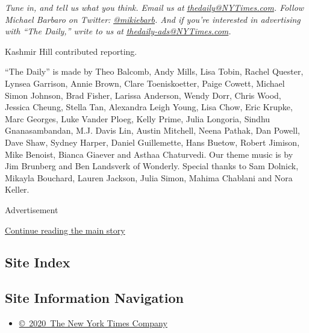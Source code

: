 \emph{Tune in, and tell us what you think. Email us at}
\href{mailto:thedaily@NYTimes.com}{\emph{thedaily@NYTimes.com}}\emph{.
Follow Michael Barbaro on Twitter:}
\href{https://twitter.com/mikiebarb}{\emph{@mikiebarb}}\emph{. And if
you're interested in advertising with ``The Daily,'' write to us at}
\href{mailto:thedaily-ads@NYTimes.com}{\emph{thedaily-ads@NYTimes.com}}\emph{.}

Kashmir Hill contributed reporting.

``The Daily'' is made by Theo Balcomb, Andy Mills, Lisa Tobin, Rachel
Quester, Lynsea Garrison, Annie Brown, Clare Toeniskoetter, Paige
Cowett, Michael Simon Johnson, Brad Fisher, Larissa Anderson, Wendy
Dorr, Chris Wood, Jessica Cheung, Stella Tan, Alexandra Leigh Young,
Lisa Chow, Eric Krupke, Marc Georges, Luke Vander Ploeg, Kelly Prime,
Julia Longoria, Sindhu Gnanasambandan, M.J. Davis Lin, Austin Mitchell,
Neena Pathak, Dan Powell, Dave Shaw, Sydney Harper, Daniel Guillemette,
Hans Buetow, Robert Jimison, Mike Benoist, Bianca Giaever and Asthaa
Chaturvedi. Our theme music is by Jim Brunberg and Ben Landsverk of
Wonderly. Special thanks to Sam Dolnick, Mikayla Bouchard, Lauren
Jackson, Julia Simon, Mahima Chablani and Nora Keller.

Advertisement

\protect\hyperlink{after-bottom}{Continue reading the main story}

\hypertarget{site-index}{%
\subsection{Site Index}\label{site-index}}

\hypertarget{site-information-navigation}{%
\subsection{Site Information
Navigation}\label{site-information-navigation}}

\begin{itemize}
\tightlist
\item
  \href{https://help.nytimes3xbfgragh.onion/hc/en-us/articles/115014792127-Copyright-notice}{©~2020~The
  New York Times Company}
\end{itemize}

